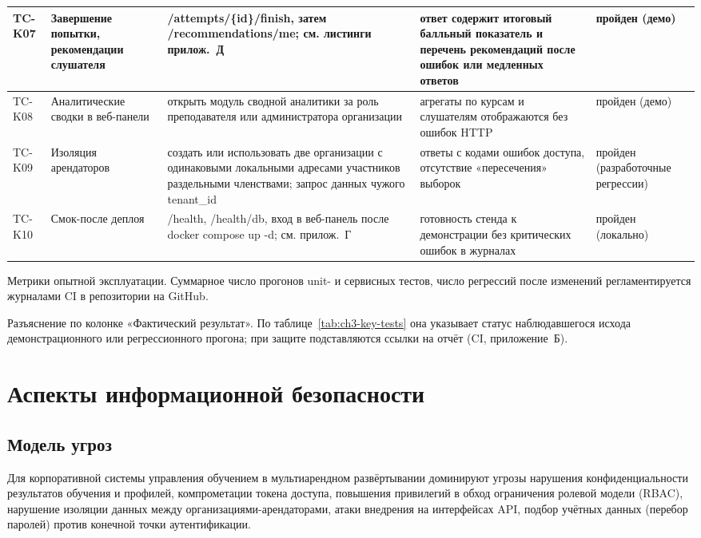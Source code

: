 {\begin{longtable}{|>{\centering\arraybackslash}p{10mm}|>{\RaggedRight\arraybackslash}p{30mm}|>{\RaggedRight\arraybackslash}p{44mm}|>{\RaggedRight\arraybackslash}p{42mm}|>{\centering\arraybackslash}p{20mm}|}
\hline
TC-K07 & Завершение попытки, рекомендации слушателя & /attempts/\{id\}/finish, затем /recommendations/me; см. листинги прилож.~Д & ответ содержит итоговый балльный показатель и перечень рекомендаций после ошибок или медленных ответов & пройден (демо) \\
\hline
TC-K08 & Аналитические сводки в веб-панели & открыть модуль сводной аналитики за роль преподавателя или администратора организации & агрегаты по курсам и слушателям отображаются без ошибок HTTP & пройден (демо) \\
\hline
TC-K09 & Изоляция арендаторов & создать или использовать две организации с одинаковыми локальными адресами участников раздельными членствами; запрос данных чужого tenant\_id & ответы с кодами ошибок доступа, отсутствие «пересечения» выборок & пройден (разработочные регрессии) \\
\hline
TC-K10 & Смок-после деплоя & /health, /health/db, вход в веб-панель после docker compose up -d; см. прилож.~Г & готовность стенда к демонстрации без критических ошибок в журналах & пройден (локально) \\
\end{longtable}
}

Метрики опытной эксплуатации. Суммарное число прогонов unit- и сервисных тестов, число регрессий после изменений регламентируется журналами CI в репозитории на GitHub\cite{sutherland2016scrum,gost7322017}.


Разъяснение по колонке «Фактический результат». По таблице~\ref{tab:ch3-key-tests} она указывает статус наблюдавшегося исхода демонстрационного или регрессионного прогона; при защите подставляются ссылки на отчёт (CI, приложение~Б)\cite{kulikov_testing_2024,gost7052008}.

\section{Аспекты информационной безопасности}

\subsection{Модель угроз}

Для корпоративной системы управления обучением в мультиарендном развёртывании доминируют угрозы нарушения конфиденциальности результатов обучения и профилей, компрометации токена доступа, повышения привилегий в обход ограничения ролевой модели (RBAC), нарушение изоляции данных между организациями-арендаторами, атаки внедрения на интерфейсах API, подбор учётных данных (перебор паролей) против конечной точки аутентификации\cite{gost509222006,gost250102015,proprofs_multitenant_lms_2025}.

